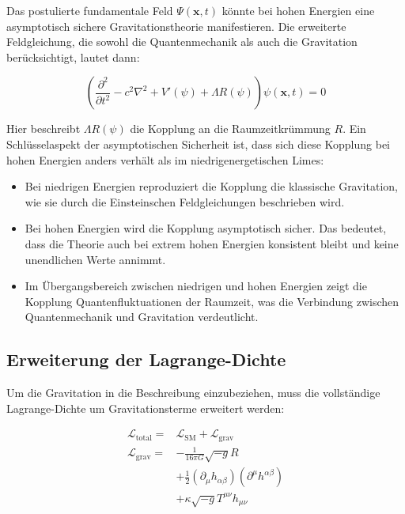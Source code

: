 \documentclass{article}
\begin{document}
Das postulierte fundamentale Feld $\Psi(\mathbf{x},t)$ könnte bei hohen Energien eine asymptotisch sichere Gravitationstheorie manifestieren. Die erweiterte Feldgleichung, die sowohl die Quantenmechanik als auch die Gravitation berücksichtigt, lautet dann:

\begin{equation}
	\left( \frac{\partial^2}{\partial t^2} - c^2 \nabla^2 + V'(\psi) + \Lambda R(\psi) \right) \psi(\mathbf{x},t) = 0
\end{equation}

Hier beschreibt $\Lambda R(\psi)$ die Kopplung an die Raumzeitkrümmung $R$. Ein Schlüsselaspekt der asymptotischen Sicherheit ist, dass sich diese Kopplung bei hohen Energien anders verhält als im niedrigenergetischen Limes:

\begin{itemize}
	\item Bei niedrigen Energien reproduziert die Kopplung die klassische Gravitation, wie sie durch die Einsteinschen Feldgleichungen beschrieben wird.
	\item Bei hohen Energien wird die Kopplung asymptotisch sicher. Das bedeutet, dass die Theorie auch bei extrem hohen Energien konsistent bleibt und keine unendlichen Werte annimmt.
	\item Im Übergangsbereich zwischen niedrigen und hohen Energien zeigt die Kopplung Quantenfluktuationen der Raumzeit, was die Verbindung zwischen Quantenmechanik und Gravitation verdeutlicht.
\end{itemize}

\subsection{Erweiterung der Lagrange-Dichte}

Um die Gravitation in die Beschreibung einzubeziehen, muss die vollständige Lagrange-Dichte um Gravitationsterme erweitert werden:

\begin{equation}
	\begin{aligned}
		\mathcal{L}_\text{total} = & \mathcal{L}_\text{SM} + \mathcal{L}_\text{grav} \\
		\mathcal{L}_\text{grav} = & -\frac{1}{16\pi G} \sqrt{-g}R \\
		& + \frac{1}{2}(\partial_\mu h_{\alpha\beta})(\partial^\mu h^{\alpha\beta}) \\
		& + \kappa \sqrt{-g}T^{\mu\nu}h_{\mu\nu}
	\end{aligned}
\end{equation}
\end{document}
